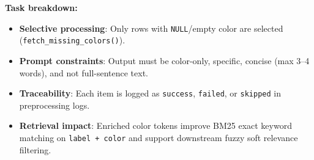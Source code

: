 \textbf{Task breakdown:}
\begin{itemize}
    \item \textbf{Selective processing}: Only rows with \texttt{NULL}/empty color are selected (\texttt{fetch\_missing\_colors()}).
    \item \textbf{Prompt constraints}: Output must be color-only, specific, concise (max 3--4 words), and not full-sentence text.
    \item \textbf{Traceability}: Each item is logged as \texttt{success}, \texttt{failed}, or \texttt{skipped} in preprocessing logs.
    \item \textbf{Retrieval impact}: Enriched color tokens improve BM25 exact keyword matching on \texttt{label + color} and support downstream fuzzy soft relevance filtering.
\end{itemize}


